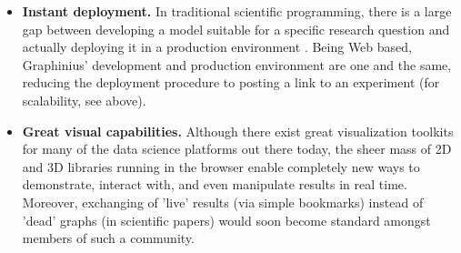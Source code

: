 \begin{itemize}
	\item \textbf{Instant deployment.} In traditional scientific programming, there is a large gap between developing a model suitable for a specific research question and actually deploying it in a production environment \citep{AnalLifecycle}. Being Web based, Graphinius' development and production environment are one and the same, reducing the deployment procedure to posting a link to an experiment (for scalability, see above).
	
	\item \textbf{Great visual capabilities.} Although there exist great visualization toolkits for many of the data science platforms out there today, the sheer mass of 2D and 3D libraries running in the browser enable completely new ways to demonstrate, interact with, and even manipulate results in real time. Moreover, exchanging of 'live' results (via simple bookmarks) instead of 'dead' graphs (in scientific papers) would soon become standard amongst members of such a community.
\end{itemize}
